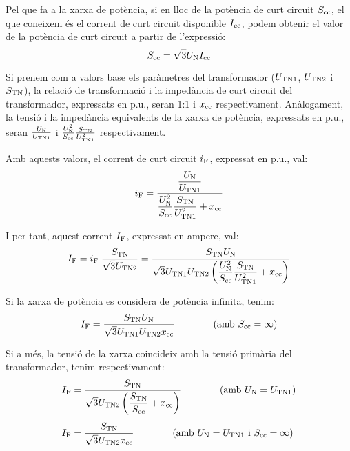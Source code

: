 Pel que fa a la xarxa de pot\`{e}ncia, si en lloc de la pot\`{e}ncia de curt
circuit $S_\mathrm{cc}$, el que coneixem \'{e}s el corrent de curt circuit
disponible $I_\mathrm{cc}$, podem obtenir el valor de la pot\`{e}ncia de
curt circuit a partir de l'expressi\'{o}:
\begin{equation}
    S_\mathrm{cc} = \sqrt{3} U_\mathrm{N} I_\mathrm{cc}
\end{equation}

 Si prenem com a valors base els
par\`{a}metres del transformador ($U_\mathrm{TN1}$, $U_\mathrm{TN2}$ i
$S_\mathrm{TN}$), la relaci\'{o} de transformaci\'{o} i la imped\`{a}ncia de curt
circuit del transformador, expressats en p.u., seran 1:1 i
$x_\mathrm{cc}$ respectivament. An\`{a}logament, la tensi\'{o} i la imped\`{a}ncia
equivalents de la xarxa de pot\`{e}ncia, expressats en p.u., seran
$\frac{U_\mathrm{N}}{U_\mathrm{TN1}}$ i $\frac{U_\mathrm{N}^2}{S_\mathrm{cc}}
\frac{S_\mathrm{TN}}{U_\mathrm{TN1}^2}$ respectivament.

Amb aquests valors, el corrent de curt circuit $i_\mathrm{F}$, expressat
en p.u., val:
\begin{equation}
    i_\mathrm{F} = \frac{\dfrac{U_\mathrm{N}}{U_\mathrm{TN1}}}{\dfrac{U_\mathrm{N}^2}{S_\mathrm{cc}}
    \dfrac{S_\mathrm{TN}}{U_\mathrm{TN1}^2} + x_\mathrm{cc}}
\end{equation}

I per tant, aquest corrent $I_\mathrm{F}$, expressat en ampere, val:
\begin{equation}
    I_\mathrm{F} = i_\mathrm{F}\; \frac{S_\mathrm{TN}}{\sqrt{3}U_\mathrm{TN2}} =
    \frac{S_\mathrm{TN} U_\mathrm{N}}{\sqrt{3} U_\mathrm{TN1}U_\mathrm{TN2}
    \left(\dfrac{U_\mathrm{N}^2}{S_\mathrm{cc}}
    \dfrac{S_\mathrm{TN}}{U_\mathrm{TN1}^2} + x_\mathrm{cc}\right)}
\end{equation}

Si la xarxa de pot\`{e}ncia es considera de pot\`{e}ncia infinita, tenim:
\begin{equation}
    I_\mathrm{F} = \frac{S_\mathrm{TN} U_\mathrm{N}}{\sqrt{3} U_\mathrm{TN1}U_\mathrm{TN2}
    x_\mathrm{cc}}\qquad\qquad (\text{amb }S_\mathrm{cc}=\infty)
\end{equation}

Si a m\'{e}s, la tensi\'{o} de la xarxa coincideix amb la tensi\'{o} prim\`{a}ria
del transformador, tenim respectivament:
\begin{align}
    I_\mathrm{F} &= \frac{S_\mathrm{TN}}{\sqrt{3} U_\mathrm{TN2}
    \left(\dfrac{S_\mathrm{TN}}{S_\mathrm{cc}} +
    x_\mathrm{cc}\right)}\qquad\qquad(\text{amb }U_\mathrm{N}=U_\mathrm{TN1})\\[1ex]
    I_\mathrm{F} &= \frac{S_\mathrm{TN}}{\sqrt{3} U_\mathrm{TN2}
    x_\mathrm{cc}}\qquad\qquad(\text{amb }U_\mathrm{N}=U_\mathrm{TN1}\text{ i }
    S_\mathrm{cc}=\infty)
\end{align}

